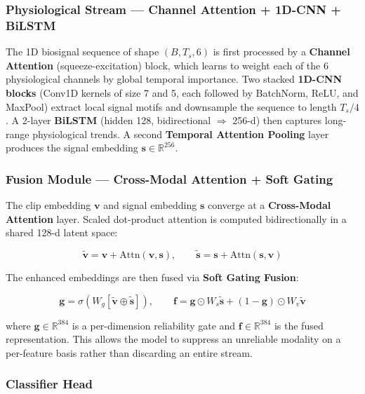 \documentclass[12pt, a4paper]{article}
\begin{document}
\subsubsection{Physiological Stream --- Channel Attention + 1D-CNN + BiLSTM}

The 1D biosignal sequence of shape $(B, T_s, 6)$ is first processed by a \textbf{Channel Attention} (squeeze-excitation) block, which learns to weight each of the 6 physiological channels by global temporal importance. Two stacked \textbf{1D-CNN blocks} (Conv1D kernels of size 7 and 5, each followed by BatchNorm, ReLU, and MaxPool) extract local signal motifs and downsample the sequence to length $T_s/4$. A 2-layer \textbf{BiLSTM} (hidden 128, bidirectional $\Rightarrow$ 256-d) then captures long-range physiological trends. A second \textbf{Temporal Attention Pooling} layer produces the signal embedding $\mathbf{s} \in \mathbb{R}^{256}$.

\subsubsection{Fusion Module --- Cross-Modal Attention + Soft Gating}

The clip embedding $\mathbf{v}$ and signal embedding $\mathbf{s}$ converge at a \textbf{Cross-Modal Attention} layer. Scaled dot-product attention is computed bidirectionally in a shared 128-d latent space:

\begin{equation}
    \tilde{\mathbf{v}} = \mathbf{v} + \text{Attn}(\mathbf{v}, \mathbf{s}), \qquad
    \tilde{\mathbf{s}} = \mathbf{s} + \text{Attn}(\mathbf{s}, \mathbf{v})
\end{equation}

The enhanced embeddings are then fused via \textbf{Soft Gating Fusion}:

\begin{equation}
    \mathbf{g} = \sigma\!\left(W_g[\tilde{\mathbf{v}} \oplus \tilde{\mathbf{s}}]\right), \qquad
    \mathbf{f} = \mathbf{g} \odot W_s\tilde{\mathbf{s}} + (1 - \mathbf{g}) \odot W_v\tilde{\mathbf{v}}
\end{equation}

where $\mathbf{g} \in \mathbb{R}^{384}$ is a per-dimension reliability gate and $\mathbf{f} \in \mathbb{R}^{384}$ is the fused representation. This allows the model to suppress an unreliable modality on a per-feature basis rather than discarding an entire stream.

\subsubsection{Classifier Head}
\end{document}
